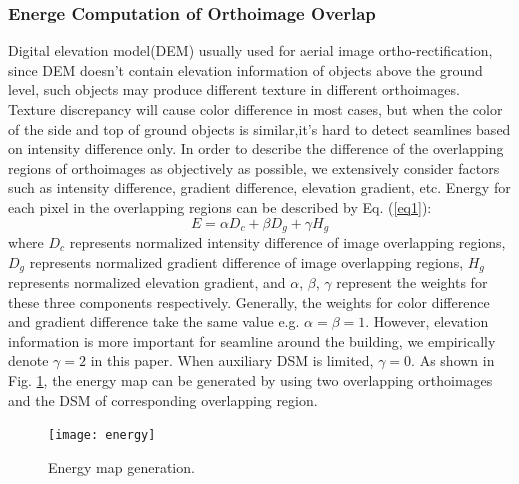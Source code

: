\documentclass[journal]{IEEEtran}
\begin{document}
\subsubsection{Energe Computation of Orthoimage Overlap}
Digital elevation model(DEM) usually used for aerial image ortho-rectification, since DEM doesn't contain elevation information of objects above the ground level, such objects may produce different texture in different orthoimages. Texture discrepancy will cause color difference in most cases, but when the color of the side and top of ground objects is similar,it's hard to detect seamlines based on intensity difference only. In order to describe the difference of the overlapping regions of orthoimages as objectively as possible, we extensively consider factors such as intensity difference, gradient difference, elevation gradient, etc. Energy for each pixel in the overlapping regions can be described by Eq. (\ref{eq1}):
\begin{equation}\label{eq1}
E=\alpha D_{c}+\beta D_{g}+\gamma H_{g}
\end{equation}
where $D_{c}$ represents normalized intensity difference of image overlapping regions, $D_{g}$ represents normalized gradient difference of image overlapping regions, $H_{g}$ represents normalized elevation gradient, and $\alpha$, $\beta$, $\gamma$ represent the weights for these three components respectively. Generally, the weights for color difference and gradient difference take the same value e.g. $\alpha = \beta = 1$. However, elevation information is more important for seamline around the building, we empirically denote $\gamma = 2$ in this paper. When auxiliary DSM is limited, $\gamma = 0$. As shown in Fig. \ref{fig:energymap}, the energy map can be generated by using two overlapping orthoimages and the DSM of corresponding overlapping region.
\begin{figure}[!t]
	\centering
	\texttt{[image: energy]}
	\caption{Energy map generation.}
	\label{fig:energymap}
\end{figure}
\end{document}
